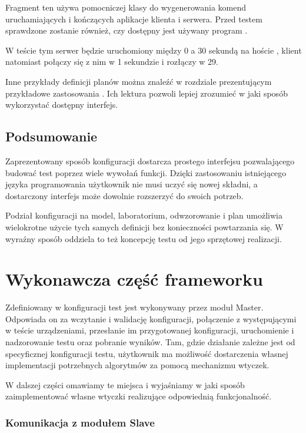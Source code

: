 \documentclass[00-praca-magisterska.tex]{subfiles}
\begin{document}
Fragment ten używa pomocniczej klasy  do wygenerowania komend
uruchamiających i kończących aplikacje klienta i serwera. Przed testem
sprawdzone zostanie również, czy dostępny jest używany program .

W teście tym serwer będzie uruchomiony między 0 a 30 sekundą na
hoście , klient natomiast połączy się z nim w 1 sekundzie i rozłączy
w 29.

Inne przykłady definicji planów można znaleźć w rozdziale prezentującym
przykładowe zastosowania . Ich lektura
pozwoli lepiej zrozumieć w jaki sposób wykorzystać dostępny interfejs.

\subsection{Podsumowanie}

Zaprezentowany sposób konfiguracji dostarcza prostego interfejsu pozwalającego
budować test poprzez wiele wywołań funkcji. Dzięki zastosowaniu istniejącego
języka programowania użytkownik nie musi uczyć się nowej składni, a dostarczony
interfejs może dowolnie rozszerzyć do swoich potrzeb.

Podział konfiguracji na model, laboratorium, odwzorowanie i plan umożliwia
wielokrotne użycie tych samych definicji bez konieczności powtarzania się. W
wyraźny sposób oddziela to też koncepcję testu od jego sprzętowej realizacji.

\section{Wykonawcza część frameworku}

Zdefiniowany w konfiguracji test jest wykonywany przez moduł Master. Odpowiada
on za wczytanie i walidację konfiguracji, połączenie z występującymi w teście
urządzeniami, przesłanie im przygotowanej konfiguracji, uruchomienie i
nadzorowanie testu oraz pobranie wyników. Tam, gdzie działanie zależne
jest od specyficznej konfiguracji testu, użytkownik ma możliwość dostarczenia
własnej implementacji potrzebnych algorytmów za pomocą mechanizmu wtyczek.

W dalszej części omawiamy te miejsca i wyjaśniamy w jaki sposób zaimplementować
własne wtyczki realizujące odpowiednią funkcjonalność.

\subsubsection{Komunikacja z modułem Slave}
\end{document}
